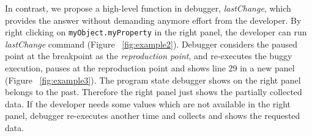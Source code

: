 \documentclass[preprint]{sigplanconf}
\begin{document}
In contrast, we propose a high-level function in debugger, \textit{lastChange}, which provides the answer without demanding anymore effort from the developer. By right clicking on \texttt{myObject.myProperty} in the right panel, the developer can run \textit{lastChange} command (Figure ~\ref{fig:example2}). Debugger considers the paused point at the breakpoint as the \textit{reproduction point}, and re-executes the buggy execution, pauses at the reproduction point and shows line 29 in a new panel (Figure ~\ref{fig:example3}). The program state debugger shows on the right panel belongs to the past. Therefore the right panel just shows the partially collected data. If the developer needs some values which are not available in the right panel, debugger re-executes another time and collects and shows the requested data. 
\end{document}
